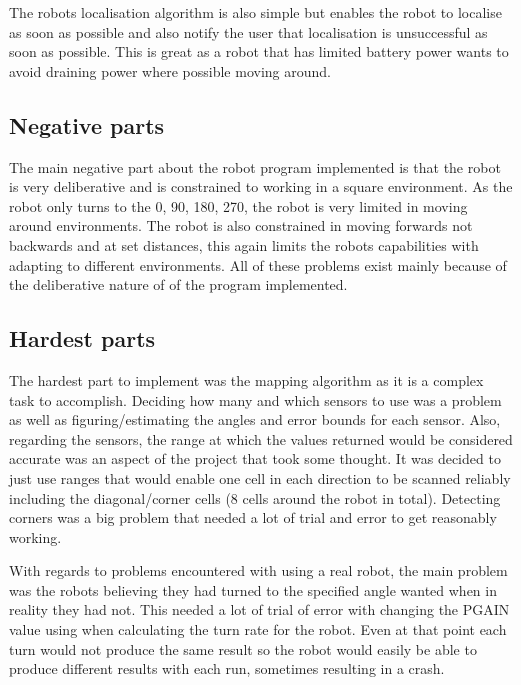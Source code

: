 \documentclass[a4paper,12pt]{article}
\begin{document}
\vspace{5mm}
\noindent The robots localisation algorithm is also simple but enables the robot to localise as soon as possible and also notify the user that localisation is unsuccessful as soon as possible. This is great as a robot that has limited battery power wants to avoid draining power where possible moving around.

\subsection{Negative parts}
\noindent The main negative part about the robot program implemented is that the robot is very deliberative and is constrained to working in a square environment. As the robot only turns to the 0, 90, 180, 270, the robot is very limited in moving around environments. The robot is also constrained in moving forwards not backwards and at set distances, this again limits the robots capabilities with adapting to different environments. All of these problems exist mainly because of the deliberative nature of of the program implemented.

\subsection{Hardest parts}
\noindent The hardest part to implement was the mapping algorithm as it is a complex task to accomplish. Deciding how many and which sensors to use was a problem as well as figuring/estimating the angles and error bounds for each sensor. Also, regarding the sensors, the range at which the values returned would be considered accurate was an aspect of the project that took some thought. It was decided to just use ranges that would enable one cell in each direction to be scanned reliably including the diagonal/corner cells (8 cells around the robot in total). Detecting corners was a big problem that needed a lot of trial and error to get reasonably working.

\vspace{5mm}
\noindent With regards to problems encountered with using a real robot, the main problem was the robots believing they had turned to the specified angle wanted when in reality they had not. This needed a lot of trial of error with changing the PGAIN value using when calculating the turn rate for the robot. Even at that point each turn would not produce the same result so the robot would easily be able to produce different results with each run, sometimes resulting in a crash.
\end{document}
